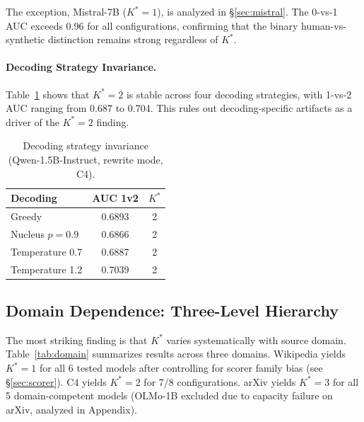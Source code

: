 \documentclass[11pt,a4paper]{article}
\newcommand{\Kstar}{K^{*}}
\begin{document}
The exception, Mistral-7B ($\Kstar = 1$), is analyzed in \S\ref{sec:mistral}. The 0-vs-1 AUC exceeds 0.96 for all configurations, confirming that the binary human-vs-synthetic distinction remains strong regardless of $\Kstar$.

\paragraph{Decoding Strategy Invariance.}
Table~\ref{tab:decoding} shows that $\Kstar = 2$ is stable across four decoding strategies, with 1-vs-2 AUC ranging from 0.687 to 0.704. This rules out decoding-specific artifacts as a driver of the $\Kstar = 2$ finding.

\begin{table}[t]
\centering
\caption{Decoding strategy invariance (Qwen-1.5B-Instruct, rewrite mode, C4).}
\label{tab:decoding}
\small
\begin{tabular}{lcc}
\toprule
\textbf{Decoding} & \textbf{AUC 1v2} & $\Kstar$ \\
\midrule
Greedy           & 0.6893 & 2 \\
Nucleus $p=0.9$  & 0.6866 & 2 \\
Temperature 0.7  & 0.6887 & 2 \\
Temperature 1.2  & 0.7039 & 2 \\
\bottomrule
\end{tabular}
\end{table}

\subsection{Domain Dependence: Three-Level Hierarchy}
\label{sec:domain}

The most striking finding is that $\Kstar$ varies systematically with source domain. Table~\ref{tab:domain} summarizes results across three domains. Wikipedia yields $\Kstar = 1$ for all 6 tested models after controlling for scorer family bias (see \S\ref{sec:scorer}). C4 yields $\Kstar = 2$ for 7/8 configurations. arXiv yields $\Kstar = 3$ for all 5 domain-competent models (OLMo-1B excluded due to capacity failure on arXiv, analyzed in Appendix).
\end{document}
